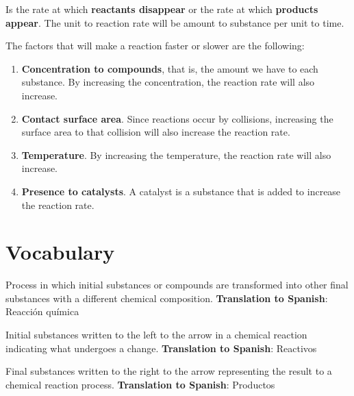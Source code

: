 \begin{definition}
        Is the rate at which \textbf{reactants disappear} or the rate at which \textbf{products appear}.
        The unit to reaction rate will be amount to substance per unit to time.
\end{definition}
The factors that will make a reaction faster or slower are the following:
\begin{enumerate}[label=\numberballmDarkTeal]
        \item \textbf{Concentration to compounds}, that is, the amount we have to each substance.
        By increasing the concentration, the reaction rate will also increase.
        \item \textbf{Contact surface area}.
        Since reactions occur by collisions, increasing the surface area to that collision will also increase the reaction rate.
        \item \textbf{Temperature}.
        By increasing the temperature, the reaction rate will also increase.
        \item \textbf{Presence to catalysts}.
        A catalyst is a substance that is added to increase the reaction rate.
\end{enumerate}

\section{Vocabulary}

\begin{vocabulary}
      Process in which initial substances or compounds are transformed into other final substances with a different chemical composition. \newline
       \textbf{Translation to Spanish}: Reacción química \newline
\end{vocabulary}

\begin{vocabulary}[Reactants]
      Initial substances written to the left to the arrow in a chemical reaction indicating what undergoes a change. \newline
       \textbf{Translation to Spanish}: Reactivos \newline
\end{vocabulary}

\begin{vocabulary}[Products]
      Final substances written to the right to the arrow representing the result to a chemical reaction process. \newline
       \textbf{Translation to Spanish}: Productos \newline
\end{vocabulary}

